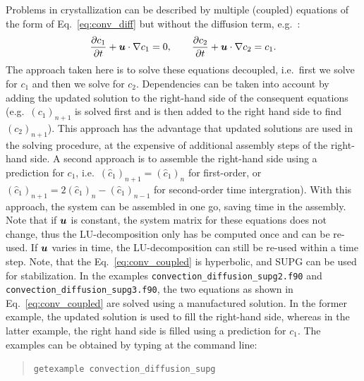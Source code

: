 Problems in crystallization can be described by multiple (coupled) equations of the form of 
Eq.~\eqref{eq:conv_diff} but without the diffusion term, e.g.~:
\begin{equation}
  \dfrac{\partial c_1}{\partial t} + \boldsymbol{u} \cdot \nabla c_1  =  0, \qquad
  \dfrac{\partial c_2}{\partial t} + \boldsymbol{u} \cdot \nabla c_2 =  c_1.
  \label{eq:conv_coupled}
\end{equation}  
The approach taken here is to solve these equations decoupled, i.e.~first we 
solve for $c_1$ and then we solve for $c_2$. Dependencies can be taken into 
account by adding the updated solution to 
the right-hand side of the consequent equations (e.g.~$(c_1)_{n+1}$ is solved 
first and is then added to the right hand side to find $(c_2)_{n+1}$). This 
approach has 
the advantage that updated solutions are used in the solving procedure, at the 
expensive of additional assembly steps of the right-hand side. A second approach
is to assemble the right-hand side using a prediction for $c_1$, 
i.e.~$(\hat{c}_1)_{n+1}= (\hat{c}_1)_{n}$ for first-order, or 
$(\hat{c}_1)_{n+1}= 2(\hat{c}_1)_{n}-(\hat{c}_1)_{n-1}$ for second-order time 
intergration). With this approach, the system can be assembled in one go, saving
time in the assembly.  Note that if $\boldsymbol{u}$ is constant, the system matrix for 
these equations does not change, thus the LU-decomposition only has be 
computed once and can be re-used. If $\boldsymbol{u}$ varies in time, the 
LU-decomposition can still be re-used within a time step. Note, that the 
Eq.~\eqref{eq:conv_coupled} is hyperbolic, and SUPG can be used for 
stabilization. In the examples \texttt{convection\_diffusion\_supg2.f90} and  
\texttt{convection\_diffusion\_supg3.f90}, the two equations as shown in 
Eq.~\eqref{eq:conv_coupled} are solved using a manufactured solution. In the
former example, the updated solution is used to fill the right-hand side, 
whereas in the latter example, the right hand side is filled using a prediction
for $c_1$. The examples can be obtained by typing at the command line:
\begin{quote}
   \texttt{getexample convection\_diffusion\_supg}
\end{quote}

